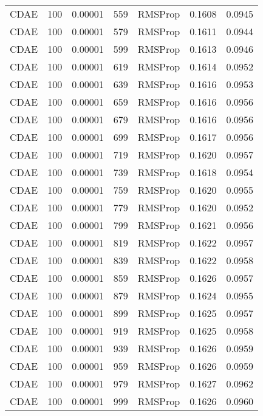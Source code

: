 \begin{tabular}{llrllrr}
    CDAE &  100 &  0.00001 &   559 &   RMSProp &  0.1608 &       0.0945 \\
    CDAE &  100 &  0.00001 &   579 &   RMSProp &  0.1611 &       0.0944 \\
    CDAE &  100 &  0.00001 &   599 &   RMSProp &  0.1613 &       0.0946 \\
    CDAE &  100 &  0.00001 &   619 &   RMSProp &  0.1614 &       0.0952 \\
    CDAE &  100 &  0.00001 &   639 &   RMSProp &  0.1616 &       0.0953 \\
    CDAE &  100 &  0.00001 &   659 &   RMSProp &  0.1616 &       0.0956 \\
    CDAE &  100 &  0.00001 &   679 &   RMSProp &  0.1616 &       0.0956 \\
    CDAE &  100 &  0.00001 &   699 &   RMSProp &  0.1617 &       0.0956 \\
    CDAE &  100 &  0.00001 &   719 &   RMSProp &  0.1620 &       0.0957 \\
    CDAE &  100 &  0.00001 &   739 &   RMSProp &  0.1618 &       0.0954 \\
    CDAE &  100 &  0.00001 &   759 &   RMSProp &  0.1620 &       0.0955 \\
    CDAE &  100 &  0.00001 &   779 &   RMSProp &  0.1620 &       0.0952 \\
    CDAE &  100 &  0.00001 &   799 &   RMSProp &  0.1621 &       0.0956 \\
    CDAE &  100 &  0.00001 &   819 &   RMSProp &  0.1622 &       0.0957 \\
    CDAE &  100 &  0.00001 &   839 &   RMSProp &  0.1622 &       0.0958 \\
    CDAE &  100 &  0.00001 &   859 &   RMSProp &  0.1626 &       0.0957 \\
    CDAE &  100 &  0.00001 &   879 &   RMSProp &  0.1624 &       0.0955 \\
    CDAE &  100 &  0.00001 &   899 &   RMSProp &  0.1625 &       0.0957 \\
    CDAE &  100 &  0.00001 &   919 &   RMSProp &  0.1625 &       0.0958 \\
    CDAE &  100 &  0.00001 &   939 &   RMSProp &  0.1626 &       0.0959 \\
    CDAE &  100 &  0.00001 &   959 &   RMSProp &  0.1626 &       0.0959 \\
    CDAE &  100 &  0.00001 &   979 &   RMSProp &  0.1627 &       0.0962 \\
    CDAE &  100 &  0.00001 &   999 &   RMSProp &  0.1626 &       0.0960 \\

\end{tabular}
